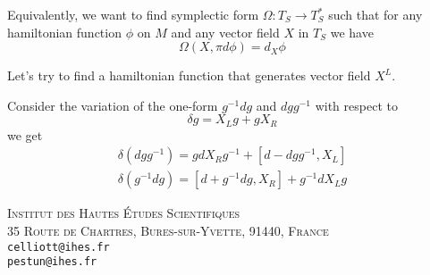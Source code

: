 \documentclass[11pt, oneside, reqno]{amsart}
\theoremstyle{definition} \newtheorem{definition}{Definition}[section]
\theoremstyle{definition} \newtheorem{remark}[definition]{Remark}
\theoremstyle{definition} \newtheorem{remarks}[definition]{Remarks}
\theoremstyle{definition} \newtheorem{question}[definition]{Question}
\theoremstyle{definition} \newtheorem*{note}{Note}
\theoremstyle{definition} \newtheorem{example}[definition]{Example}
\theoremstyle{definition} \newtheorem{examples}[definition]{Examples}
\begin{document}
 Equivalently, we want to find symplectic form $\Omega: T_{S} \to T_{S}^{*} $ such
 that for any hamiltonian function $\phi$ on $M$ and any vector field $X$ in $T_{S}$ we
 have
 \begin{equation}
   \Omega(X, \pi d \phi) = d_{X} \phi 
 \end{equation}
 
 Let's try to find a hamiltonian function that generates vector field $X^{L}$.

 Consider the variation of the one-form $g^{-1} dg$ and $dg g^{-1}$ with respect to
 \begin{equation}
   \delta g  = X_L g  + g X_{R}
 \end{equation}
 we get
 \begin{equation}
   \begin{aligned}
     \delta ( dg g^{-1}) =   g d X_{R} g^{-1} + [d - dg g^{-1}, X_L] \\
     \delta ( g^{-1} dg) =  [d + g^{-1} dg, X_{R}] + g^{-1} dX_L g 
   \end{aligned}
 \end{equation}
 
 








\textsc{Institut des Hautes \'Etudes Scientifiques}\\
\textsc{35 Route de Chartres, Bures-sur-Yvette, 91440, France}\\
\texttt{celliott@ihes.fr}\\ 
\texttt{pestun@ihes.fr}
 
\end{document}
